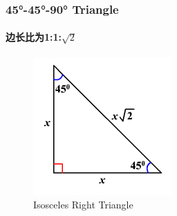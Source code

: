 \documentclass[
	11pt, %
]{beamer}
\begin{document}

\begin{frame}
	\frametitle{45°-45°-90° Triangle} %
	\framesubtitle{边长比为1:1:$\sqrt{2}$}
	\begin{figure}
		\includegraphics[width=0.5\linewidth]{45-45-90-Triangle.png}
		\caption{\alert{Isosceles Right Triangle}}
	\end{figure}	
\end{frame}

\end{document}
